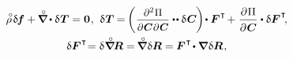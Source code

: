 \begin{otherlanguage}{russian}
\nopagebreak\vspace{-0.05em}\begin{equation}\label{variationsforcurrentconfiguration}
\begin{array}{c}
\mathcircabove{\rho} \hspace{.25ex} \variation{\hspace{-0.2ex}\bm{f}}
+ \hspace{-0.1ex} \boldnablacircled \hspace{-0.12ex} \dotp \variation{\hspace{.1ex}\firstpiolakirchhoffstress}
= \bm{0}
\hspace{.1ex} , \:\,
%
\variation{\hspace{.1ex}\firstpiolakirchhoffstress} \hspace{-0.1ex}
= \hspace{-0.2ex} \left( \hspace{.1ex} \scalebox{0.92}{$ \displaystyle \frac{\partial^2 \hspace{.1ex} \Pi}{\raisemath{-0.1em}{\partial \hspace{.1ex} \bm{C} \hspace{.1ex} \partial \hspace{.1ex} \bm{C}}} $} \dotdotp \variation{\hspace{.12ex}\bm{C}} \hspace{-0.16ex} \right) \hspace{-0.32ex} \dotp \bm{F}^{\hspace{.1ex}\T} \hspace{-0.24ex}
+ \hspace{.1ex}
\displaystyle \frac{\partial \hspace{.1ex} \Pi}{\raisemath{-0.1em}{\partial \hspace{.1ex} \bm{C}}} \dotp \variation{\bm{F}}^{\hspace{.1ex}\T}
\hspace{-0.4ex} ,
\\[1em]
%
\variation{\bm{F}}^{\hspace{.1ex}\T} \hspace{-0.5ex}
= \variation{\hspace{.1ex} \boldnablacircled \hspace{-0.16ex} \bm{R}}
= \hspace{-0.2ex} \boldnablacircled \hspace{.1ex} \variation{\bm{R}}
= \hspace{-0.12ex} \bm{F}^{\hspace{.1ex}\T} \hspace{-0.25ex} \dotp \boldnabla \hspace{.1ex} \variation{\bm{R}} \hspace{.16ex},

\end{array}
\end{equation}
\end{otherlanguage}
